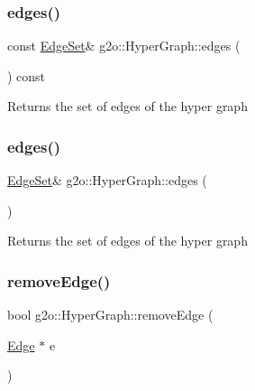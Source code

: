 \subsubsection{\texorpdfstring{edges()}{edges()}\hspace{0.1cm}{\footnotesize\ttfamily [1/2]}}
{\footnotesize\ttfamily const \mbox{\hyperlink{classg2o_1_1_hyper_graph_a5e2970e236c0dcb4eff7c205d7b6b4ae}{Edge\+Set}}\& g2o\+::\+Hyper\+Graph\+::edges (\begin{DoxyParamCaption}{ }\end{DoxyParamCaption}) const\hspace{0.3cm}{\ttfamily [inline]}}

\begin{DoxyReturn}{Returns}
the set of edges of the hyper graph 
\end{DoxyReturn}
\mbox{\label{classg2o_1_1_hyper_graph_a2f9f023fe2fb491ef9af873b9e683006}} 
\subsubsection{\texorpdfstring{edges()}{edges()}\hspace{0.1cm}{\footnotesize\ttfamily [2/2]}}
{\footnotesize\ttfamily \mbox{\hyperlink{classg2o_1_1_hyper_graph_a5e2970e236c0dcb4eff7c205d7b6b4ae}{Edge\+Set}}\& g2o\+::\+Hyper\+Graph\+::edges (\begin{DoxyParamCaption}{ }\end{DoxyParamCaption})\hspace{0.3cm}{\ttfamily [inline]}}

\begin{DoxyReturn}{Returns}
the set of edges of the hyper graph 
\end{DoxyReturn}
\mbox{\label{classg2o_1_1_hyper_graph_a33e5a60705ce673d647aa1613da9d99b}} 
\subsubsection{\texorpdfstring{remove\+Edge()}{removeEdge()}}
{\footnotesize\ttfamily bool g2o\+::\+Hyper\+Graph\+::remove\+Edge (\begin{DoxyParamCaption}\item[{\mbox{\hyperlink{classg2o_1_1_hyper_graph_1_1_edge}{Edge}} $\ast$}]{e }\end{DoxyParamCaption})\hspace{0.3cm}{\ttfamily [virtual]}}



